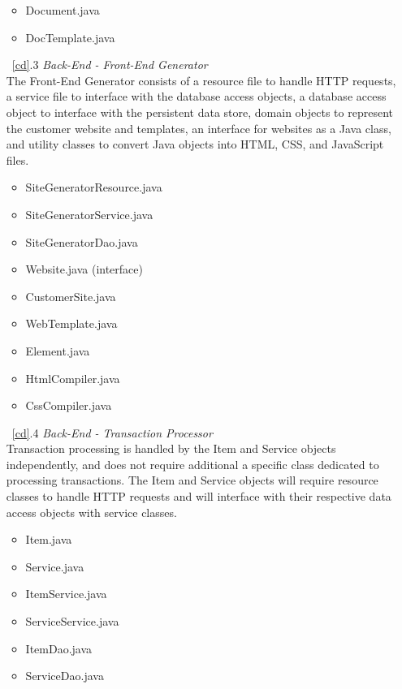 \documentclass{article}
\newcommand{\br}{\vspace{2mm}}
\begin{document}
\begin{enumerate}
\begin{itemize}
            \item Document.java
            \item DocTemplate.java
        \end{itemize}
    \item[~\ref{cd}.3 ] \emph{Back-End - Front-End Generator}\br\\
        The Front-End Generator consists of a resource file to handle HTTP requests,
        a service file to interface with the database access objects, a database
        access object to interface with the persistent data store,
        domain objects to represent the customer website and templates, an interface
        for websites as a Java class, and utility classes to convert Java objects
        into HTML, CSS, and JavaScript files.
        \begin{itemize}
            \item SiteGeneratorResource.java
            \item SiteGeneratorService.java
            \item SiteGeneratorDao.java
            \item Website.java (interface)
            \item CustomerSite.java
            \item WebTemplate.java
            \item Element.java
            \item HtmlCompiler.java
            \item CssCompiler.java
        \end{itemize}
    \item[~\ref{cd}.4 ] \emph{Back-End - Transaction Processor}\br\\
        Transaction processing is handled by the Item and Service objects
        independently, and does not require additional a specific class dedicated
        to processing transactions.  The Item and Service objects will require
        resource classes to handle HTTP requests and will interface with their
        respective data access objects with service classes.
        \begin{itemize}
            \item Item.java
            \item Service.java
            \item ItemService.java
            \item ServiceService.java
            \item ItemDao.java
            \item ServiceDao.java

\end{itemize}
\end{enumerate}
\end{document}
